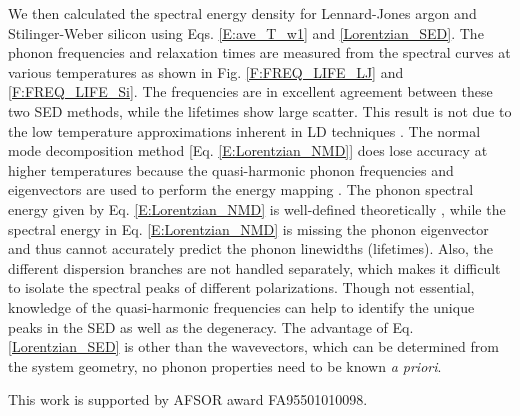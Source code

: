 \documentclass[twocolumn,10pt]{asme2e}
\begin{document}
We then calculated the spectral energy density for Lennard-Jones argon and Stilinger-Weber silicon using Eqs$.$ \eqref{E:ave_T_w1} and \eqref{Lorentzian_SED}. The phonon frequencies and
relaxation times are measured from the spectral curves at various temperatures as shown in Fig$.$ \ref{F:FREQ_LIFE_LJ} and \ref{F:FREQ_LIFE_Si}. The
frequencies are in excellent agreement between these two SED methods, while the lifetimes show large scatter. This result is not due to the low temperature approximations inherent in LD techniques
\cite{turney2009a}.  The normal mode decomposition method [Eq$.$ \eqref{E:Lorentzian_NMD}]  does lose accuracy
at higher temperatures because the quasi-harmonic phonon frequencies and
eigenvectors are used to perform the energy mapping
\cite{turney2009a}. The phonon spectral energy given by Eq$.$ \eqref{E:Lorentzian_NMD} is well-defined theoretically \cite{wallace1972}, while the spectral energy in Eq$.$ \eqref{E:Lorentzian_NMD} is missing the phonon eigenvector and thus cannot accurately predict the phonon linewidths (lifetimes). Also, the different dispersion branches are not handled
separately, which makes it difficult to isolate the spectral peaks of different polarizations. Though not essential, knowledge of the quasi-harmonic frequencies can help to identify
the unique peaks in the SED as well as the degeneracy. The advantage of Eq$.$ \eqref{Lorentzian_SED} is other than the wavevectors, which can be determined from the system geometry, no phonon
properties need to be known {\em a priori}.

\begin{acknowledgment}
This work is supported by AFSOR award FA95501010098.
\end{acknowledgment}





\end{document}
